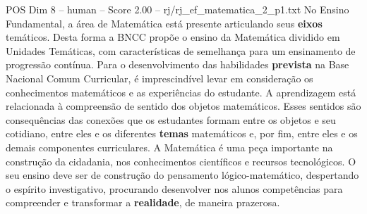 \begin{textsample}{POS Dim 8 – human – Score 2.00 – rj/rj\_ef\_matematica\_2\_p1.txt}  \label{ex:f8_pos_009}
No Ensino Fundamental, a área de Matemática está presente articulando seus \textbf{eixos} temáticos.
Desta forma a BNCC propõe o ensino da Matemática dividido em Unidades Temáticas, com características de semelhança para um ensinamento de progressão contínua.
Para o desenvolvimento das habilidades \textbf{prevista} na Base Nacional Comum Curricular, é imprescindível levar em consideração os conhecimentos matemáticos e as experiências do estudante.
A aprendizagem está relacionada à compreensão de sentido dos objetos matemáticos.
Esses sentidos são consequências das conexões que os estudantes formam entre os objetos e seu cotidiano, entre eles e os diferentes \textbf{temas} matemáticos e, por fim, entre eles e os demais componentes curriculares.
A Matemática é uma peça importante na construção da cidadania, nos conhecimentos científicos e recursos tecnológicos.
O seu ensino deve ser de construção do pensamento lógico-matemático, despertando o espírito investigativo, procurando desenvolver nos alunos competências para compreender e transformar a \textbf{realidade}, de maneira prazerosa.

\end{textsample}
